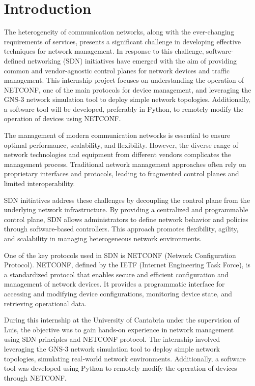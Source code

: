 \chapter{Introduction}
The heterogeneity of communication networks, along with the ever-changing requirements of services, presents a significant challenge in developing effective techniques for network management. In response to this challenge, software-defined networking (SDN) initiatives have emerged with the aim of providing common and vendor-agnostic control planes for network devices and traffic management. This internship project focuses on understanding the operation of NETCONF, one of the main protocols for device management, and leveraging the GNS-3 network simulation tool to deploy simple network topologies. Additionally, a software tool will be developed, preferably in Python, to remotely modify the operation of devices using NETCONF.

The management of modern communication networks is essential to ensure optimal performance, scalability, and flexibility. However, the diverse range of network technologies and equipment from different vendors complicates the management process. Traditional network management approaches often rely on proprietary interfaces and protocols, leading to fragmented control planes and limited interoperability.

SDN initiatives address these challenges by decoupling the control plane from the underlying network infrastructure. By providing a centralized and programmable control plane, SDN allows administrators to define network behavior and policies through software-based controllers. This approach promotes flexibility, agility, and scalability in managing heterogeneous network environments.

One of the key protocols used in SDN is NETCONF (Network Configuration Protocol). NETCONF, defined by the IETF (Internet Engineering Task Force), is a standardized protocol that enables secure and efficient configuration and management of network devices. It provides a programmatic interface for accessing and modifying device configurations, monitoring device state, and retrieving operational data.

During this internship at the University of Cantabria under the supervision of Luis, the objective was to gain hands-on experience in network management using SDN principles and NETCONF protocol. The internship involved leveraging the GNS-3 network simulation tool to deploy simple network topologies, simulating real-world network environments. Additionally, a software tool was developed using Python to remotely modify the operation of devices through NETCONF.

